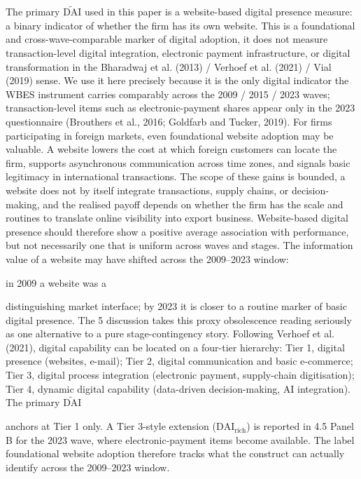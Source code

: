 \documentclass[12pt,a4paper]{article}
\begin{document}
The primary \(\tilde{\mathrm{DAI}}\) used in this paper is a
website-based digital presence measure: a binary indicator of whether
the firm has its own website. This is a foundational and
cross-wave-comparable marker of digital adoption, it does not measure
transaction-level digital integration, electronic payment
infrastructure, or digital transformation in the Bharadwaj et al. (2013)
/ Verhoef et al. (2021) / Vial (2019) sense. We use it here precisely
because it is the only digital indicator the WBES instrument carries
comparably across the 2009 / 2015 / 2023 waves; transaction-level items
such as electronic-payment shares appear only in the 2023 questionnaire
(Brouthers et al., 2016; Goldfarb and Tucker, 2019). For firms
participating in foreign markets, even foundational website adoption may
be valuable. A website lowers the cost at which foreign customers can
locate the firm, supports asynchronous communication across time zones,
and signals basic legitimacy in international transactions. The scope of
these gains is bounded, a website does not by itself integrate
transactions, supply chains, or decision-making, and the realised payoff
depends on whether the firm has the scale and routines to translate
online visibility into export business. Website-based digital presence
should therefore show a positive average association with performance,
but not necessarily one that is uniform across waves and stages. The
information value of a website may have shifted across the 2009--2023
window:

in 2009 a website was a

distinguishing market interface; by 2023 it is closer to a routine
marker of basic digital presence. The 5 discussion takes this proxy
obsolescence reading seriously as one alternative to a pure
stage-contingency story. Following Verhoef et al. (2021), digital
capability can be located on a four-tier hierarchy: Tier 1, digital
presence (websites, e-mail); Tier 2, digital communication and basic
e-commerce; Tier 3, digital process integration (electronic payment,
supply-chain digitisation); Tier 4, dynamic digital capability
(data-driven decision-making, AI integration). The primary
\(\tilde{\mathrm{DAI}}\)

anchors at Tier 1 only. A Tier 3-style extension
(\(\mathrm{DAI}_{\text{rich}}\)) is reported in 4.5 Panel B for the 2023
wave, where electronic-payment items become available. The label
foundational website adoption therefore tracks what the construct can
actually identify across the 2009--2023 window.
\end{document}
